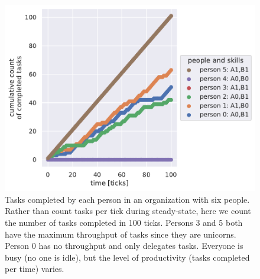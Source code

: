 \begin{figure}[H] %
\centering
\includegraphics[width=1\textwidth]{images/task_distribution_tasks_per_person_simCount1_skills2_levels1_taskduration1_people6_social0_ticks100.pdf}
\caption{Tasks completed by each person in an organization with six people. Rather than count tasks per tick during steady-state, here we count the number of tasks completed in 100 ticks. Persons 3 and 5 both have the maximum throughput of tasks since they are unicorns. Person 0 has no throughput and only delegates tasks. Everyone is busy (no one is idle), but the level of productivity (tasks completed per time) varies.}
\label{fig:task-distribution-tasks-per-person}
\end{figure}



